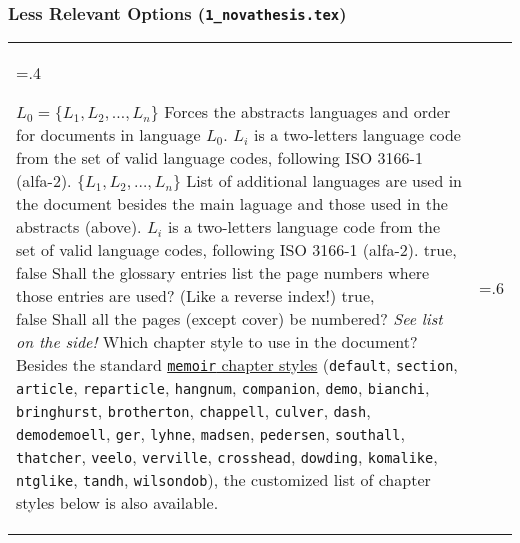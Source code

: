 \subsubsection{Less Relevant Options (\texttt{1\_novathesis.tex})} %
\label{ssub:less_relevant_options_1}


\bgroup
\begin{xltabular}{\linewidth}{>{\hsize=.4\hsize\raggedright\arraybackslash}X>{\hsize=.6\hsize}X}
  \toprule
	    {$L_0 = \{L_1, L_2, …, L_n\}$}%
	    {Forces the abstracts languages and order for documents in language $L_0$.}%
		{%
		$L_i$ is a two-letters language code from the set of valid language codes, following ISO 3166-1 (alfa-2).
	    }
	    \midrule
	    {$\{L_1, L_2, …, L_n\}$}%
	    {List of additional languages are used in the document besides the main laguage and those used in the abstracts (above).}%
		{%
		$L_i$ is a two-letters language code from the set of valid language codes, following ISO 3166-1 (alfa-2).
	    }
	    \midrule
  	  	{true, \newline false}%
	    {Shall the glossary entries list the page numbers where those entries are used?  (Like a reverse index!)}%
		{}
	    \midrule
  	  	{true,\newline false }%
	    {Shall all the pages (except cover) be numbered?}%
		{}
	    \midrule
	    {\emph{See list on the side!}}%
	    {Which chapter style to use in the document?}%
	{%
	Besides the standard \href{https://tug.ctan.org/info/MemoirChapStyles/MemoirChapStyles.pdf}{\texttt{memoir} chapter styles} (\texttt{default}, \texttt{section}, \texttt{article}, \texttt{reparticle}, \texttt{hangnum}, \texttt{companion}, \texttt{demo}, \texttt{bianchi}, \texttt{bringhurst}, \texttt{brotherton}, \texttt{chappell}, \texttt{culver}, \texttt{dash}, \texttt{demodemoell}, \texttt{ger}, \texttt{lyhne}, \texttt{madsen}, \texttt{pedersen}, \texttt{southall}, \texttt{thatcher}, \texttt{veelo}, \texttt{verville}, \texttt{crosshead}, \texttt{dowding}, \texttt{komalike}, \texttt{ntglike}, \texttt{tandh}, \texttt{wilsondob}), the customized list of chapter styles below is also available.
}
\end{xltabular}
